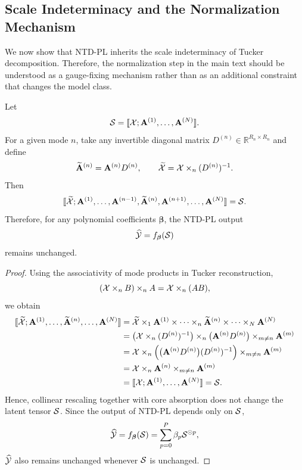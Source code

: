 \subsection{Scale Indeterminacy and the Normalization Mechanism}

We now show that NTD-PL inherits the scale indeterminacy of Tucker decomposition. Therefore, the normalization step in the main text should be understood as a gauge-fixing mechanism rather than as an additional constraint that changes the model class.

\begin{proposition}
\label{prop:scale_invariance_app}
Let
\begin{equation}
\mathcal{S}
=
\llbracket \mathcal{X};\mathbf A^{(1)},\dots,\mathbf A^{(N)}\rrbracket.
\end{equation}
For a given mode $n$, take any invertible diagonal matrix $D^{(n)}\in\mathbb{R}^{R_n\times R_n}$ and define
\begin{equation}
\widetilde{\mathbf A}^{(n)} = \mathbf A^{(n)}D^{(n)},\qquad
\widetilde{\mathcal{X}} = \mathcal{X} \times_n (D^{(n)})^{-1}.
\end{equation}
Then
\begin{equation}
\llbracket \widetilde{\mathcal{X}};\mathbf A^{(1)},\dots,\mathbf A^{(n-1)},\widetilde{\mathbf A}^{(n)},\mathbf A^{(n+1)},\dots,\mathbf A^{(N)}\rrbracket
=
\mathcal{S}.
\end{equation}
Therefore, for any polynomial coefficients $\boldsymbol\beta$, the NTD-PL output
\begin{equation}
\widehat{\mathcal{Y}}=f_{\boldsymbol\beta}(\mathcal{S})
\end{equation}
remains unchanged.
\end{proposition}

\begin{proof}
Using the associativity of mode products in Tucker reconstruction,
\[
(\mathcal{X}\times_n B)\times_n A = \mathcal{X}\times_n (AB),
\]
we obtain
\begin{align}
\llbracket \widetilde{\mathcal{X}};\mathbf A^{(1)},\dots,\widetilde{\mathbf A}^{(n)},\dots,\mathbf A^{(N)}\rrbracket
&=
\widetilde{\mathcal{X}}\times_1 \mathbf A^{(1)}\times\cdots\times_n \widetilde{\mathbf A}^{(n)}\times\cdots\times_N \mathbf A^{(N)} \\
&=
\bigl(\mathcal{X}\times_n (D^{(n)})^{-1}\bigr)\times_n \bigl(\mathbf A^{(n)}D^{(n)}\bigr)\times_{m\neq n}\mathbf A^{(m)} \\
&=
\mathcal{X}\times_n \Bigl(\bigl(\mathbf A^{(n)}D^{(n)}\bigr)(D^{(n)})^{-1}\Bigr)\times_{m\neq n}\mathbf A^{(m)} \\
&=
\mathcal{X}\times_n \mathbf A^{(n)}\times_{m\neq n}\mathbf A^{(m)} \\
&=
\llbracket \mathcal{X};\mathbf A^{(1)},\dots,\mathbf A^{(N)}\rrbracket
=
\mathcal{S}.
\end{align}
Hence, collinear rescaling together with core absorption does not change the latent tensor $\mathcal{S}$. Since the output of NTD-PL depends only on $\mathcal{S}$,
\begin{equation}
\widehat{\mathcal{Y}}
=
f_{\boldsymbol\beta}(\mathcal{S})
=
\sum_{p=0}^{P}\beta_p \mathcal{S}^{\odot p},
\end{equation}
$\widehat{\mathcal{Y}}$ also remains unchanged whenever $\mathcal{S}$ is unchanged.
\end{proof}

